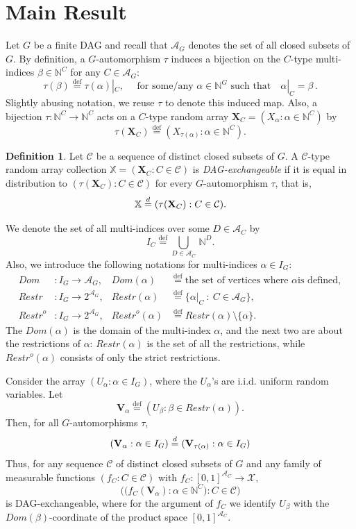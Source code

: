 \documentclass[10pt]{amsart}
\theoremstyle{definition}\newtheorem{defi}[theo]{Definition}\newtheorem{rema}[theo]{Remark}\newtheorem{exam}[theo]{Example}\newtheorem{exem}[theo]{Example}\newtheorem{nota}[theo]{Notation}
\newcommand{\alf}{\alpha}%
\newcommand*\bb{\beta}
\newcommand*{\defeq}{\stackrel{\mathrm{def}}{=}}
\newcommand{\indices}[1]{\mathbb{N}^{#1}}
\newcommand{\res}[2]{#1|_{#2}}
\renewcommand{\d}{\buildrel{d}\over{=}}
\newcommand*\rstr{\mathit{Restr}}
\newcommand*\srstr{\mathit{Restr}^o}
\newcommand*\dom{\mathit{Dom}}
\newcommand*\X{\mathbb{X}}
\newcommand*\N{\mathbb{N}}
\renewcommand{\AA}{\mathcal{A}}
\newcommand*\CC{{\mathcal{C}}}
\newcommand*\XX{{\mathcal{X}}}
\newcommand*\bX{\mathbf{X}}
\begin{document}
\section{Main Result}\label{sec:result}
Let $G$ be a finite DAG and recall that $\AA_G$ denotes the set of all closed subsets of $G$. By definition, a $G$-automorphism $\tau$ induces a bijection on the $C$-type multi-indices $\bb\in \indices C$ for any $C\in\AA_G$:
\[
\tau(\bb)
\defeq \res{\tau(\alf)}C,\quad \text{ for some/any }\alf \in \indices G\text{ such that}\quad\res \alf C=\bb\,.
\]
Slightly abusing notation, we reuse $\tau$ to denote this induced map. Also, a bijection $\tau\colon \indices C\to \indices C$ acts on a $C$-type random array $\bX_C = (X_\alf : \alf \in \indices C)$ by
\[
\tau(\bX_C)
\defeq {\left(X_{\tau(\alf)} : \alf \in \indices C\right)}.
\]


\begin{defi}
Let $\CC$ be a sequence of distinct closed subsets of $G$. A $\CC$-type random array collection $\X=(\bX_C : C \in \CC)$ is \emph{DAG-exchangeable} if it is equal in distribution to $(\tau(\bX_C) : C \in \CC)$ for every $G$-automorphism $\tau$, that is,
\[
\X \d (\tau(\bX_C) : C \in \CC).
\]
\end{defi}


We denote the set of all multi-indices over some $D \in \AA_C$ by
\[
I_C
\defeq \bigcup_{D \in \AA_C}\,\N^D.
\]
Also, we introduce the following notations for multi-indices $\alf \in I_G$:
\begin{align*}
\dom & \colon I_G \to \AA_G, &
\dom(\alf) &
\defeq \text{the set of vertices where }\alf \text{is defined},
\\
\rstr & \colon I_G \to 2^{\AA_G}, &
\rstr(\alf) &
\defeq \{\alf|_C~:~C \in \AA_G\},
\\
\srstr & \colon I_G \to 2^{\AA_G}, &
\srstr(\alf) &
\defeq \rstr(\alf) \setminus\{\alf\}.
\end{align*}
The $\dom(\alf)$ is the domain of the multi-index $\alf$, and the next two are about the restrictions of $\alf$: $\rstr(\alf)$ is the set of all the restrictions, while $\srstr(\alf)$ consists of only the strict restrictions.

Consider the array $(U_\alpha : \alpha \in I_G)$, where the $U_\alpha$'s are i.i.d. uniform random variables. Let
\[
\mathbf{V}_\alpha
\defeq (U_\beta : \beta \in \rstr(\alf)).
\]
Then, for all $G$-automorphisms $\tau$,
\[
(\mathbf{V}_\alpha : \alpha \in I_G)
\d (\mathbf{V}_{\tau(\alpha)} : \alpha \in I_G)
\]
Thus, for any sequence $\CC$ of distinct closed subsets of $G$ and any family of measurable functions $(f_C : C \in \CC)$ with $f_C : [0,1]^{\AA_C} \to \XX$,
\[
\Big(\big(f_C(\mathbf{V}_\alpha): \alpha \in \N^C\big) : C \in \CC \Big)
\]
is DAG-exchangeable, where for the argument of $f_C$ we identify $U_\beta$ with the $\dom(\bb)$-coordinate of the product space $[0,1]^{\AA_C}$.
\end{document}
